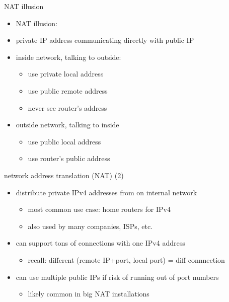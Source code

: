 \begin{frame}{NAT illusion}
    \begin{itemize}
    \item NAT illusion:
    \item private IP address communicating directly with public IP
    \vspace{.5cm}
    \item inside network, talking to outside:
        \begin{itemize}
        \item use private local address
        \item use public remote address
        \item never see router's address
        \end{itemize}
    \item outside network, talking to inside
        \begin{itemize}
        \item use public local address
        \item use router's public address
        \end{itemize}
    \end{itemize}
\end{frame}

\begin{frame}{network address translation (NAT) (2)}
    \begin{itemize}
    \item distribute private IPv4 addresses from on internal network
        \begin{itemize}
        \item most common use case: home routers for IPv4
        \item also used by many companies, ISPs, etc.
        \end{itemize}
    \item can support tons of connections with one IPv4 address
        \begin{itemize}
        \item recall: different (remote IP+port, local port) = diff connnection
        \end{itemize}
    \item can use multiple public IPs if risk of running out of port numbers
        \begin{itemize}
        \item likely common in big NAT installations
        \end{itemize}
    \end{itemize}
\end{frame}

